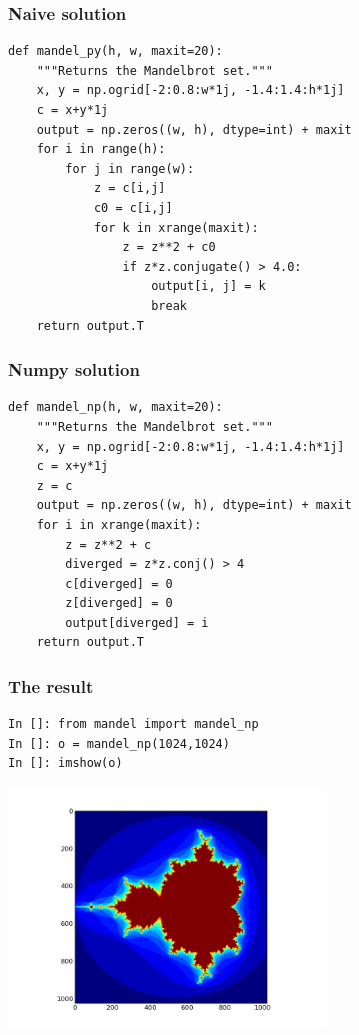 \documentclass[14pt,compress]{beamer}
\begin{document}
\begin{frame}[fragile]
    \small
    \vspace*{-0.25in}
  \frametitle{Naive solution}
  \begin{lstlisting}
def mandel_py(h, w, maxit=20):
    """Returns the Mandelbrot set."""
    x, y = np.ogrid[-2:0.8:w*1j, -1.4:1.4:h*1j]
    c = x+y*1j
    output = np.zeros((w, h), dtype=int) + maxit
    for i in range(h):
        for j in range(w):
            z = c[i,j]
            c0 = c[i,j]
            for k in xrange(maxit):
                z = z**2 + c0
                if z*z.conjugate() > 4.0:
                    output[i, j] = k
                    break
    return output.T
  \end{lstlisting}
\end{frame}

\begin{frame}[fragile]
  \frametitle{Numpy solution}
  \small
  \begin{lstlisting}
def mandel_np(h, w, maxit=20):
    """Returns the Mandelbrot set."""
    x, y = np.ogrid[-2:0.8:w*1j, -1.4:1.4:h*1j]
    c = x+y*1j
    z = c
    output = np.zeros((w, h), dtype=int) + maxit
    for i in xrange(maxit):
        z = z**2 + c
        diverged = z*z.conj() > 4
        c[diverged] = 0
        z[diverged] = 0
        output[diverged] = i
    return output.T
  \end{lstlisting}
\end{frame}

\begin{frame}
    \frametitle{The result}
\begin{lstlisting}
In []: from mandel import mandel_np
In []: o = mandel_np(1024,1024)
In []: imshow(o)
\end{lstlisting}
\vspace*{-1em}
\begin{center}
    \includegraphics[height=2.5in]{data/mandelbrot}
\end{center}
\end{frame}
\end{document}
